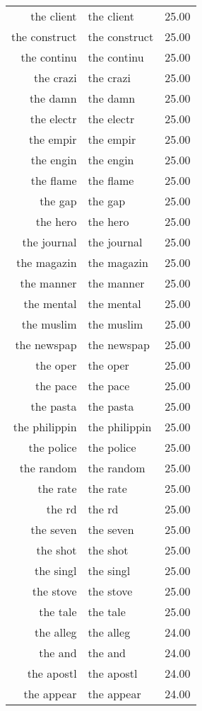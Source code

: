 \begin{table}[ht]
\begin{tabular}{rlr}
  the client & the client & 25.00 \\ 
  the construct & the construct & 25.00 \\ 
  the continu & the continu & 25.00 \\ 
  the crazi & the crazi & 25.00 \\ 
  the damn & the damn & 25.00 \\ 
  the electr & the electr & 25.00 \\ 
  the empir & the empir & 25.00 \\ 
  the engin & the engin & 25.00 \\ 
  the flame & the flame & 25.00 \\ 
  the gap & the gap & 25.00 \\ 
  the hero & the hero & 25.00 \\ 
  the journal & the journal & 25.00 \\ 
  the magazin & the magazin & 25.00 \\ 
  the manner & the manner & 25.00 \\ 
  the mental & the mental & 25.00 \\ 
  the muslim & the muslim & 25.00 \\ 
  the newspap & the newspap & 25.00 \\ 
  the oper & the oper & 25.00 \\ 
  the pace & the pace & 25.00 \\ 
  the pasta & the pasta & 25.00 \\ 
  the philippin & the philippin & 25.00 \\ 
  the police & the police & 25.00 \\ 
  the random & the random & 25.00 \\ 
  the rate & the rate & 25.00 \\ 
  the rd & the rd & 25.00 \\ 
  the seven & the seven & 25.00 \\ 
  the shot & the shot & 25.00 \\ 
  the singl & the singl & 25.00 \\ 
  the stove & the stove & 25.00 \\ 
  the tale & the tale & 25.00 \\ 
  the alleg & the alleg & 24.00 \\ 
  the and & the and & 24.00 \\ 
  the apostl & the apostl & 24.00 \\ 
  the appear & the appear & 24.00 \\ 

\end{tabular}
\end{table}
